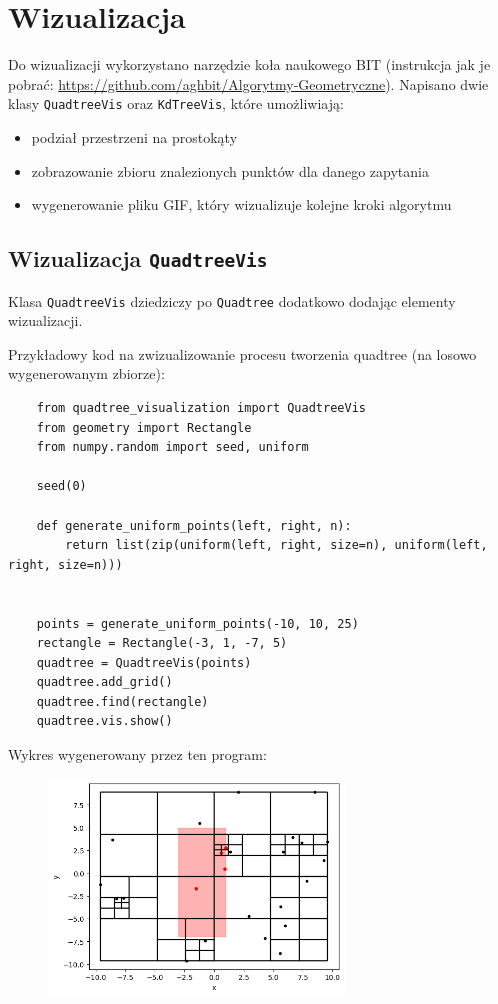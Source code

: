 \documentclass[11pt]{scrartcl}
\begin{document}
\section{Wizualizacja}
Do wizualizacji wykorzystano narzędzie koła naukowego BIT (instrukcja jak je pobrać: \url{https://github.com/aghbit/Algorytmy-Geometryczne}). Napisano dwie klasy \texttt{QuadtreeVis} oraz \texttt{KdTreeVis}, które umożliwiają:
\begin{itemize}
    \item podział przestrzeni na prostokąty
    \item zobrazowanie zbioru znalezionych punktów dla danego zapytania
    \item wygenerowanie pliku GIF, który wizualizuje kolejne kroki algorytmu
\end{itemize}

\subsection{Wizualizacja \texttt{QuadtreeVis}}
Klasa \texttt{QuadtreeVis} dziedziczy po \texttt{Quadtree} dodatkowo dodając elementy wizualizacji.

Przykładowy kod na zwizualizowanie procesu tworzenia quadtree (na losowo wygenerowanym zbiorze):

\begin{verbatim}
    from quadtree_visualization import QuadtreeVis
    from geometry import Rectangle
    from numpy.random import seed, uniform

    seed(0)

    def generate_uniform_points(left, right, n):
        return list(zip(uniform(left, right, size=n), uniform(left, right, size=n)))
    

    points = generate_uniform_points(-10, 10, 25)
    rectangle = Rectangle(-3, 1, -7, 5)
    quadtree = QuadtreeVis(points)
    quadtree.add_grid()
    quadtree.find(rectangle)
    quadtree.vis.show()
\end{verbatim}

\newpage
Wykres wygenerowany przez ten program:

\begin{figure}[H]
    \centering
    \includegraphics[width=0.7\textwidth]{images/quadtree_vis.png}
\end{figure}
\end{document}
